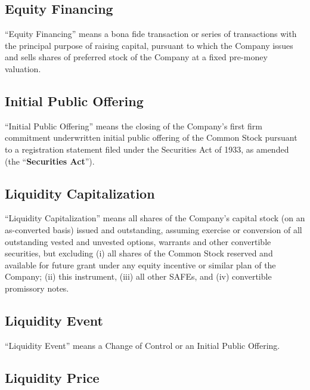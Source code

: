 \subsection{Equity Financing}
\label{sec:equityfinancingdef}

\begin{sloppypar}
“Equity Financing” means a bona fide transaction or series of
transactions with the principal purpose of raising capital, pursuant
to which the Company issues and sells shares of preferred stock of the
Company at a fixed pre-money valuation.
\end{sloppypar}

\subsection{Initial Public Offering}
\label{sec:initialpublicoffering}

“Initial Public Offering” means the closing of the Company’s first
firm commitment underwritten initial public offering of the Common
Stock pursuant to a registration statement filed under the Securities
Act of 1933, as amended (the “\textbf{Securities Act}”).

\subsection{Liquidity Capitalization}
\label{sec:liquiditycapitalization}

\begin{sloppypar}
“Liquidity Capitalization” means all shares of the Company’s capital
stock (on an as-converted basis) issued and outstanding, assuming
exercise or conversion of all outstanding vested and unvested options,
warrants and other convertible securities, but excluding (i) all
shares of the Common Stock reserved and available for future grant
under any equity incentive or similar plan of the Company; (ii) this
instrument, (iii) all other SAFEs, and (iv) convertible promissory
notes.
\end{sloppypar}

\subsection{Liquidity Event}
\label{sec:liquidityeventdef}

“Liquidity Event” means a Change of Control or an Initial Public Offering.

\subsection{Liquidity Price}
\label{sec:liquidityprice}

